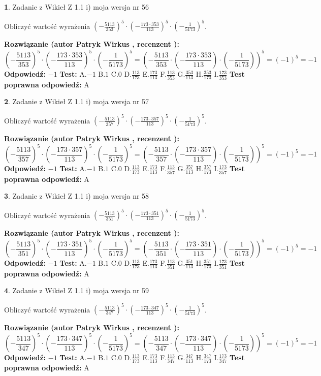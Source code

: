 \documentclass[12pt, a4paper]{article}
\theoremstyle{definition} %
\newtheorem{zad}{}
\newcommand{\zadStart}[1]{\begin{zad}#1\newline}
\newcommand{\zadStop}{\end{zad}}
\newcommand{\rozwStart}[2]{\noindent \textbf{Rozwiązanie (autor #1 , recenzent #2): }\newline}
\newcommand{\rozwStop}{\newline}
\newcommand{\odpStart}{\noindent \textbf{Odpowiedź:}\newline}
\newcommand{\odpStop}{\newline}
\newcommand{\testStart}{\noindent \textbf{Test:}\newline}
\newcommand{\testStop}{\newline}
\newcommand{\kluczStart}{\noindent \textbf{Test poprawna odpowiedź:}\newline}
\newcommand{\kluczStop}{\newline}
\begin{document}
\zadStart{Zadanie z Wikieł Z 1.1 i) moja wersja nr 56}

Obliczyć wartość wyrażenia $(-\frac{5113}{353})^{5} \cdot (-\frac{173 \cdot 353}{113})^{5} \cdot (-\frac{1}{5173})^{5}$.
\zadStop
\rozwStart{Patryk Wirkus}{}
$$(-\frac{5113}{353})^{5} \cdot (-\frac{173 \cdot 353}{113})^{5} \cdot (-\frac{1}{5173})^{5} = (-\frac{5113}{353} \cdot (-\frac{173 \cdot 353}{113}) \cdot (-\frac{1}{5173}))^{5} = (-1)^{5} = -1$$
\rozwStop
\odpStart
$-1$
\odpStop
\testStart
A.$-1$ B.$1$ C.$0$ D.$\frac{113}{173}$ E.$\frac{173}{113}$
F.$\frac{113}{353}$ G.$\frac{353}{113}$
H.$\frac{353}{173}$
I.$\frac{173}{353}$
\testStop
\kluczStart
A
\kluczStop



\zadStart{Zadanie z Wikieł Z 1.1 i) moja wersja nr 57}

Obliczyć wartość wyrażenia $(-\frac{5113}{357})^{5} \cdot (-\frac{173 \cdot 357}{113})^{5} \cdot (-\frac{1}{5173})^{5}$.
\zadStop
\rozwStart{Patryk Wirkus}{}
$$(-\frac{5113}{357})^{5} \cdot (-\frac{173 \cdot 357}{113})^{5} \cdot (-\frac{1}{5173})^{5} = (-\frac{5113}{357} \cdot (-\frac{173 \cdot 357}{113}) \cdot (-\frac{1}{5173}))^{5} = (-1)^{5} = -1$$
\rozwStop
\odpStart
$-1$
\odpStop
\testStart
A.$-1$ B.$1$ C.$0$ D.$\frac{113}{173}$ E.$\frac{173}{113}$
F.$\frac{113}{357}$ G.$\frac{357}{113}$
H.$\frac{357}{173}$
I.$\frac{173}{357}$
\testStop
\kluczStart
A
\kluczStop



\zadStart{Zadanie z Wikieł Z 1.1 i) moja wersja nr 58}

Obliczyć wartość wyrażenia $(-\frac{5113}{351})^{5} \cdot (-\frac{173 \cdot 351}{113})^{5} \cdot (-\frac{1}{5173})^{5}$.
\zadStop
\rozwStart{Patryk Wirkus}{}
$$(-\frac{5113}{351})^{5} \cdot (-\frac{173 \cdot 351}{113})^{5} \cdot (-\frac{1}{5173})^{5} = (-\frac{5113}{351} \cdot (-\frac{173 \cdot 351}{113}) \cdot (-\frac{1}{5173}))^{5} = (-1)^{5} = -1$$
\rozwStop
\odpStart
$-1$
\odpStop
\testStart
A.$-1$ B.$1$ C.$0$ D.$\frac{113}{173}$ E.$\frac{173}{113}$
F.$\frac{113}{351}$ G.$\frac{351}{113}$
H.$\frac{351}{173}$
I.$\frac{173}{351}$
\testStop
\kluczStart
A
\kluczStop



\zadStart{Zadanie z Wikieł Z 1.1 i) moja wersja nr 59}

Obliczyć wartość wyrażenia $(-\frac{5113}{347})^{5} \cdot (-\frac{173 \cdot 347}{113})^{5} \cdot (-\frac{1}{5173})^{5}$.
\zadStop
\rozwStart{Patryk Wirkus}{}
$$(-\frac{5113}{347})^{5} \cdot (-\frac{173 \cdot 347}{113})^{5} \cdot (-\frac{1}{5173})^{5} = (-\frac{5113}{347} \cdot (-\frac{173 \cdot 347}{113}) \cdot (-\frac{1}{5173}))^{5} = (-1)^{5} = -1$$
\rozwStop
\odpStart
$-1$
\odpStop
\testStart
A.$-1$ B.$1$ C.$0$ D.$\frac{113}{173}$ E.$\frac{173}{113}$
F.$\frac{113}{347}$ G.$\frac{347}{113}$
H.$\frac{347}{173}$
I.$\frac{173}{347}$
\testStop
\kluczStart
A
\kluczStop
\end{document}
